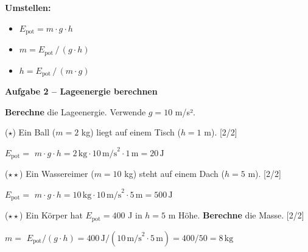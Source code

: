 \documentclass[11pt, a4paper]{article}
\newcommand{\lsg}[1]{\textcolor{loesung}{\textbf{#1}}}
\newcommand{\punktebox}[1]{\hfill\small\textcolor{mittelgrau}{[\textcolor{loesung}{#1}/#1]}}
\newcommand{\aufgabe}[1]{%
    \needspace{4\baselineskip}%
    \vspace{10pt}%
    \noindent\textbf{\textcolor{fachfarbe}{Aufgabe #1}}%
    \vspace{4pt}%
    \nopagebreak[4]%
}
\newcommand{\operator}[1]{\textbf{\textcolor{fachfarbe}{#1}}}
\begin{document}
\begin{merkkasten}[title={\textbf{Kasten 3: Formel-Dreieck}}]
\begin{center}
\end{center}

\vspace{4pt}
\textbf{Umstellen:}
\begin{itemize}[leftmargin=2em, itemsep=2pt]
    \item $E_\text{pot} = m \cdot g \cdot h$
    \item $m = E_\text{pot} \,/\, (g \cdot h)$
    \item $h = E_\text{pot} \,/\, (m \cdot g)$
\end{itemize}
\end{merkkasten}

\newpage

\aufgabe{2 – Lageenergie berechnen}

\operator{Berechne} die Lageenergie. Verwende $g = 10$ m/s².

\begin{teil}
\item ($\star$) Ein Ball ($m = 2$ kg) liegt auf einem Tisch ($h = 1$ m). \punktebox{2}

\vspace{0.3em}
$E_\text{pot} = $ \lsg{$m \cdot g \cdot h = 2\,\text{kg} \cdot 10\,\text{m/s}^2 \cdot 1\,\text{m} = 20\,\text{J}$}

\vspace{0.8em}

\item ($\star\star$) Ein Wassereimer ($m = 10$ kg) steht auf einem Dach ($h = 5$ m). \punktebox{2}

\vspace{0.3em}
$E_\text{pot} = $ \lsg{$m \cdot g \cdot h = 10\,\text{kg} \cdot 10\,\text{m/s}^2 \cdot 5\,\text{m} = 500\,\text{J}$}

\vspace{0.8em}

\item ($\star\star$) Ein Körper hat $E_\text{pot} = 400$ J in $h = 5$ m Höhe. \operator{Berechne} die Masse. \punktebox{2}

\vspace{0.3em}
$m = $ \lsg{$E_\text{pot} / (g \cdot h) = 400\,\text{J} / (10\,\text{m/s}^2 \cdot 5\,\text{m}) = 400 / 50 = 8\,\text{kg}$}

\end{teil}
\end{document}
